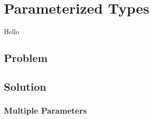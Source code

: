 \chapter{Parameterized Types}

Hello

\section{Problem}
\section{Solution}

\csharpsection{\csharp}
\subsection{Multiple Parameters}



